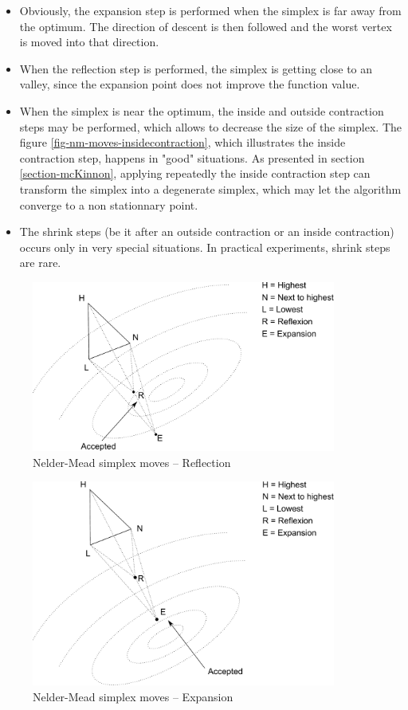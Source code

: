 \begin{itemize}
\item Obviously, the expansion step is performed when the 
simplex is far away from the optimum. The direction of 
descent is then followed and the worst vertex is moved 
into that direction.
\item When the reflection step is performed, the simplex is 
getting close to an valley, since the expansion point 
does not improve the function value.
\item When the simplex is near the optimum, 
the inside and outside contraction steps may be performed, which 
allows to decrease the size of the simplex.
The figure \ref{fig-nm-moves-insidecontraction}, which illustrates 
the inside contraction step, happens in "good" situations.
As presented in section \ref{section-mcKinnon}, applying 
repeatedly the inside contraction step can transform 
the simplex into a degenerate simplex, which may let the algorithm
converge to a non stationnary point.
\item The shrink steps (be it after an outside contraction or an inside 
contraction) occurs only in very special situations. In practical experiments,
shrink steps are rare.
\end{itemize}

\begin{figure}
\begin{center}
\includegraphics[width=10cm]{nelder-mead-reflection.pdf}
\end{center}
\caption{Nelder-Mead simplex moves -- Reflection}
\label{fig-nm-moves-reflection}
\end{figure}

\begin{figure}
\begin{center}
\includegraphics[width=10cm]{nelder-mead-extension.pdf}
\end{center}
\caption{Nelder-Mead simplex moves -- Expansion}
\label{fig-nm-moves-expansion}
\end{figure}

